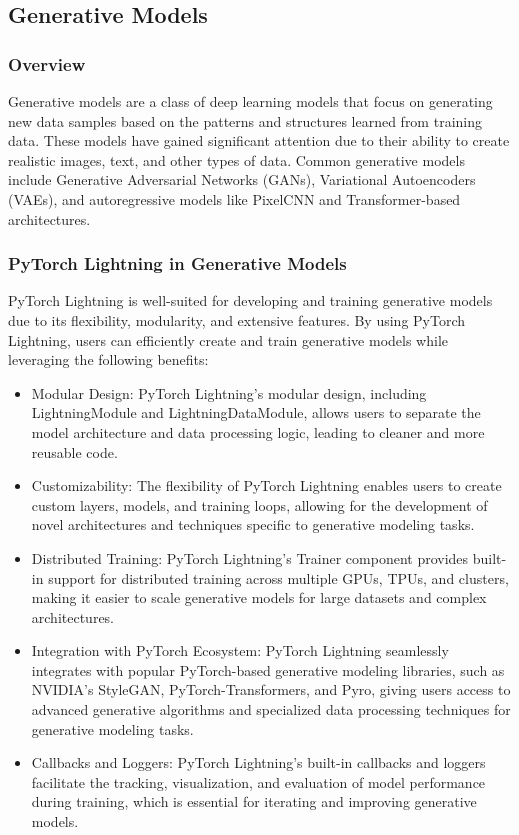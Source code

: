 \documentclass[12pt]{article}
\begin{document}
\subsection{Generative Models}

\subsubsection{Overview}

Generative models are a class of deep learning models that focus on generating new data samples based on the patterns and structures learned from training data. These models have gained significant attention due to their ability to create realistic images, text, and other types of data. Common generative models include Generative Adversarial Networks (GANs), Variational Autoencoders (VAEs), and autoregressive models like PixelCNN and Transformer-based architectures.

\subsubsection{PyTorch Lightning in Generative Models}

PyTorch Lightning is well-suited for developing and training generative models due to its flexibility, modularity, and extensive features. By using PyTorch Lightning, users can efficiently create and train generative models while leveraging the following benefits:

\begin{itemize}
    \item Modular Design: PyTorch Lightning's modular design, including LightningModule and LightningDataModule, allows users to separate the model architecture and data processing logic, leading to cleaner and more reusable code.
    \item Customizability: The flexibility of PyTorch Lightning enables users to create custom layers, models, and training loops, allowing for the development of novel architectures and techniques specific to generative modeling tasks.
    \item Distributed Training: PyTorch Lightning's Trainer component provides built-in support for distributed training across multiple GPUs, TPUs, and clusters, making it easier to scale generative models for large datasets and complex architectures.
    \item Integration with PyTorch Ecosystem: PyTorch Lightning seamlessly integrates with popular PyTorch-based generative modeling libraries, such as NVIDIA's StyleGAN, PyTorch-Transformers, and Pyro, giving users access to advanced generative algorithms and specialized data processing techniques for generative modeling tasks.
    \item Callbacks and Loggers: PyTorch Lightning's built-in callbacks and loggers facilitate the tracking, visualization, and evaluation of model performance during training, which is essential for iterating and improving generative models.
\end{itemize}
\end{document}
